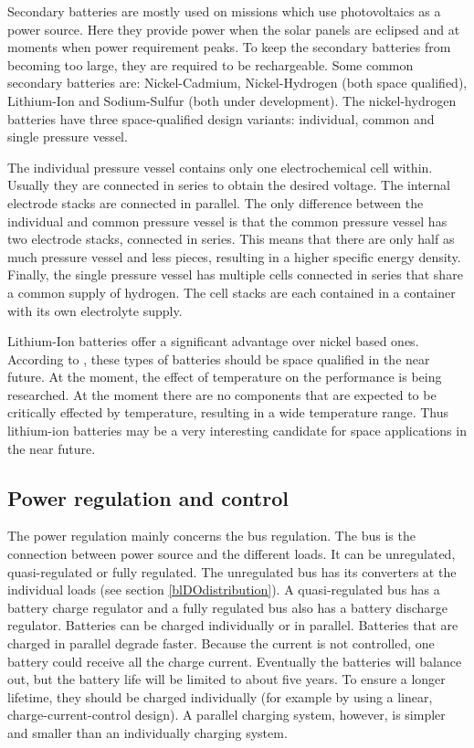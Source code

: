 Secondary batteries are mostly used on missions which use photovoltaics as a power source. Here they provide power when the solar panels are eclipsed and at moments when power requirement peaks. To keep the secondary batteries from becoming too large, they are required to be rechargeable. Some common secondary batteries are: Nickel-Cadmium, Nickel-Hydrogen (both space qualified), Lithium-Ion and Sodium-Sulfur (both under development). The nickel-hydrogen batteries have three space-qualified design variants: individual, common and single pressure vessel.

The individual pressure vessel contains only one electrochemical cell within. Usually they are connected in series to obtain the desired voltage.
The internal electrode stacks are connected in parallel.
The only difference between the individual and common pressure vessel is that the common pressure vessel has two electrode stacks, connected in series. This means that there are only half as much pressure vessel and less pieces, resulting in a higher specific energy density. 
Finally, the single pressure vessel has multiple cells connected in series that share a common supply of hydrogen. The cell stacks are each contained in a container with its own electrolyte supply\cite{larson}. 

Lithium-Ion batteries offer a significant advantage over nickel based ones. According to \cite{larson}, these types of batteries should be space qualified in the near future. At the moment, the effect of temperature on the performance is being researched. At the moment there are no components that are expected to be critically effected by temperature, resulting in a wide temperature range. Thus lithium-ion batteries may be a very interesting candidate for space applications in the near future\cite{lithium1}.

\subsection{Power regulation and control}
\label{blDOregulation}

The power regulation mainly concerns the bus regulation. The bus is the connection between power source and the different loads. It can be unregulated, quasi-regulated or fully regulated. The unregulated bus has its converters at the individual loads (see section \ref{blDOdistribution}).
A quasi-regulated bus has a battery charge regulator and a fully regulated bus also has a battery discharge regulator.
Batteries can be charged individually or in parallel. Batteries that are charged in parallel degrade faster. Because the current is not controlled, one battery could receive all the charge current. Eventually the batteries will balance out, but the battery life will be limited to about five years. To ensure a longer lifetime, they should be charged individually (for example by using a linear, charge-current-control design). A parallel charging system, however, is simpler and smaller than an individually charging system.

